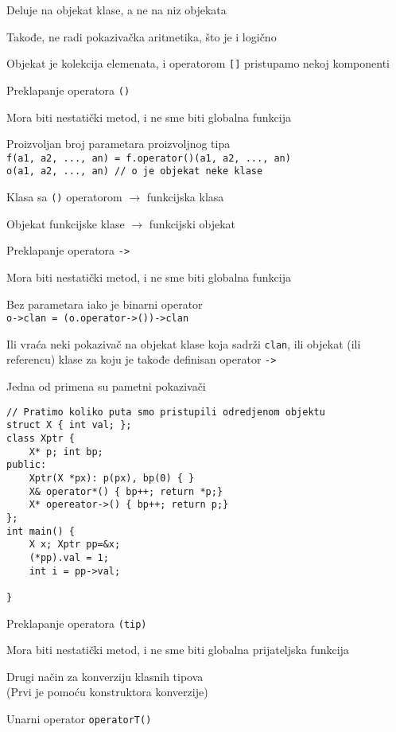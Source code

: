 \documentclass{article}
\newenvironment{xitemize}{%
    
    \itemize
    \larger
}{%
    \enditemize
}
\let\olditemize\itemize
\let\endolditemize\enditemize
\renewenvironment{itemize}{%
    \smaller
    \olditemize
}{%
    \endolditemize
}
\providecommand{\inlinecode}[1]{\texttt{#1}}
\begin{document}
\begin{xitemize}
\begin{itemize}
    \item Deluje na objekat klase, a ne na niz objekata
    \item Takođe, ne radi pokazivačka aritmetika, što je i logično
    \item Objekat je kolekcija elemenata, i operatorom \inlinecode{[]} pristupamo nekoj komponenti
\end{itemize}
\item Preklapanje operatora \inlinecode{()}
\begin{itemize}
    \item Mora biti nestatički metod, i ne sme biti globalna funkcija
    \item Proizvoljan broj parametara proizvoljnog tipa\\
    \inlinecode{f(a1, a2, ..., an) = f.operator()(a1, a2, ..., an)}\\
    \inlinecode{o(a1, a2, ..., an) // o je objekat neke klase}
    \item Klasa sa \inlinecode{()} operatorom $\rightarrow$ funkcijska klasa
    \item Objekat funkcijske klase $\rightarrow$ funkcijski objekat
\end{itemize}
\item Preklapanje operatora \inlinecode{->}
\begin{itemize}
    \item Mora biti nestatički metod, i ne sme biti globalna funkcija
    \item Bez parametara iako je binarni operator\\
    \inlinecode{o->clan = (o.operator->())->clan}
    \item Ili vraća neki pokazivač na objekat klase koja sadrži \inlinecode{clan}, ili objekat (ili referencu) klase za koju je takođe definisan operator \inlinecode{->}
    \item Jedna od primena su pametni pokazivači
    \begin{lstlisting}
// Pratimo koliko puta smo pristupili odredjenom objektu
struct X { int val; };
class Xptr {
    X* p; int bp;
public:
    Xptr(X *px): p(px), bp(0) { }
    X& operator*() { bp++; return *p;}
    X* opereator->() { bp++; return p;}
};
int main() {
    X x; Xptr pp=&x;
    (*pp).val = 1;
    int i = pp->val;

}
    \end{lstlisting}
\end{itemize}
\item Preklapanje operatora \inlinecode{(tip)}
\begin{itemize}
    \item Mora biti nestatički metod, i ne sme biti globalna prijateljska funkcija
    \item Drugi način za konverziju klasnih tipova\\
    (Prvi je pomoću konstruktora konverzije)
    \item Unarni operator \inlinecode{operatorT()}
    

\end{itemize}
\end{xitemize}
\end{document}
